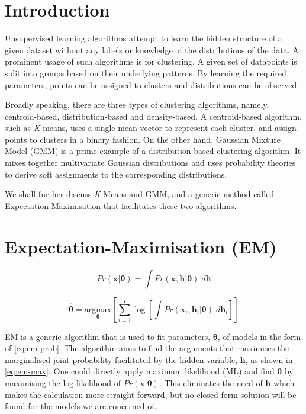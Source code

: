 \documentclass[11pt,openright,a4paper]{article}
\numberwithin{equation}{section}
\begin{document}
\section{Introduction} \label{sec:intro}
Unsupervised learning algorithms attempt to learn the hidden structure of a given dataset without any labels or knowledge of the distributions of the data. A prominent usage of such algorithms is for clustering. A given set of datapoints is split into groups based on their underlying patterns. By learning the required parameters, points can be assigned to clusters and distributions can be observed.

Broadly speaking, there are three types of clustering algorithms, namely, centroid-based, distribution-based and density-based. A centroid-based algorithm, such as \textit{K}-means, uses a single mean vector to represent each cluster, and assign points to clusters in a binary fashion. On the other hand, Gaussian Mixture Model (GMM) is a prime example of a distribution-based clustering algorithm. It mixes together multivariate Gaussian distributions and uses probability theories to derive soft assignments to the corresponding distributions. 

We shall further discuss \textit{K}-Means and GMM, and a generic method called Expectation-Maximisation that facilitates these two algorithms.


\section{Expectation-Maximisation (EM)} \label{sec:em}

\begin{equation} \label{eq:em-prob}
    Pr\left( \boldsymbol{x} | \boldsymbol{\theta} \right) = 
    \int Pr\left( \boldsymbol{x},\boldsymbol{h} | \boldsymbol{\theta} \right) \; d\boldsymbol{h}
\end{equation}

\begin{equation} \label{eq:em-max}
    \hat{\boldsymbol{\theta}} = 
        \underset{\boldsymbol{\theta}}{\mathrm{argmax}}
        \left[ \sum_{i=1}^{I} \log \left[ 
            \int Pr\left( \boldsymbol{x}_{i},\boldsymbol{h}_{i} | \boldsymbol{\theta} \right) \; d\boldsymbol{h}_{i} 
            \right] 
        \right]
\end{equation}

EM is a generic algorithm that is used to fit parameters, $\boldsymbol{\theta}$, of models in the form of \autoref{eq:em-prob}. The algorithm aims to find the arguments that maximises the marginalised joint probability facilitated by the hidden variable, $\boldsymbol{h}$, as shown in \autoref{eq:em-max}. One could directly apply maximum likelihood (ML) and find $\boldsymbol{\theta}$ by maximising the log likelihood of $Pr\left( \boldsymbol{x}| \boldsymbol{\theta} \right)$. This eliminates the need of $\boldsymbol{h}$ which makes the calculation more straight-forward, but no closed form solution will be found for the models we are concerned of.
\end{document}
